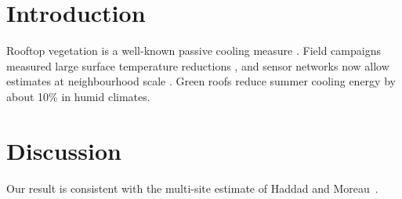 \documentclass{article}
\begin{document}
\section{Introduction}
Rooftop vegetation is a well-known passive cooling measure \cite{varga2005}. Field campaigns measured large surface temperature reductions \cite{okafor2011,zhou2021}, and sensor networks now allow estimates at neighbourhood scale \citep{haddad2022}. Green roofs reduce summer cooling energy by about 10\% \cite{haddad2022} in humid climates.

\section{Discussion}
Our result is consistent with the multi-site estimate of Haddad and Moreau~\cite{haddad2022,varga2005}.



\end{document}
